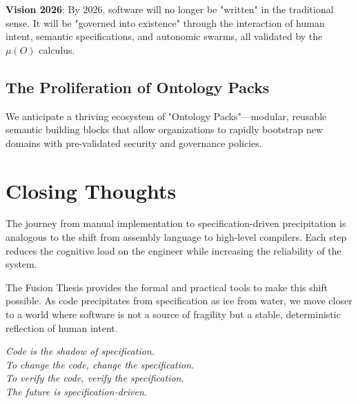 \begin{tcolorbox}[colback=green!5!white,colframe=green!75!black]
    \textbf{Vision 2026}: By 2026, software will no longer be "written" in the traditional sense. It will be "governed into existence" through the interaction of human intent, semantic specifications, and autonomic swarms, all validated by the $\mu(O)$ calculus.
\end{tcolorbox}

\subsection{The Proliferation of Ontology Packs}

We anticipate a thriving ecosystem of "Ontology Packs"---modular, reusable semantic building blocks that allow organizations to rapidly bootstrap new domains with pre-validated security and governance policies.

\section{Closing Thoughts}

The journey from manual implementation to specification-driven precipitation is analogous to the shift from assembly language to high-level compilers. Each step reduces the cognitive load on the engineer while increasing the reliability of the system.

The Fusion Thesis provides the formal and practical tools to make this shift possible. As code precipitates from specification as ice from water, we move closer to a world where software is not a source of fragility but a stable, deterministic reflection of human intent.

\begin{center}
    \textit{Code is the shadow of specification. \\
    To change the code, change the specification. \\
    To verify the code, verify the specification. \\
    The future is specification-driven.}
\end{center}
